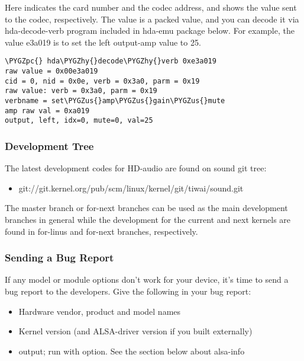 \documentclass[a4paper,8pt,english]{sphinxmanual}
\def\PYGZus{\char`\_}
\def\PYGZpc{\char`\%}
\def\PYGZhy{\char`\-}
\begin{document}
Here \code{{[}0:0{]}} indicates the card number and the codec address, and
 shows the value sent to the codec, respectively.  The value is
a packed value, and you can decode it via hda-decode-verb program
included in hda-emu package below.  For example, the value e3a019 is
to set the left output-amp value to 25.

\begin{Verbatim}[commandchars=\\\{\}]
\PYGZpc{} hda\PYGZhy{}decode\PYGZhy{}verb 0xe3a019
raw value = 0x00e3a019
cid = 0, nid = 0x0e, verb = 0x3a0, parm = 0x19
raw value: verb = 0x3a0, parm = 0x19
verbname = set\PYGZus{}amp\PYGZus{}gain\PYGZus{}mute
amp raw val = 0xa019
output, left, idx=0, mute=0, val=25
\end{Verbatim}


\subsubsection{Development Tree}
\label{sound/hd-audio/notes:development-tree}
The latest development codes for HD-audio are found on sound git tree:
\begin{itemize}
\item {} 
git://git.kernel.org/pub/scm/linux/kernel/git/tiwai/sound.git

\end{itemize}

The master branch or for-next branches can be used as the main
development branches in general while the development for the current
and next kernels are found in for-linus and for-next branches,
respectively.


\subsubsection{Sending a Bug Report}
\label{sound/hd-audio/notes:sending-a-bug-report}
If any model or module options don't work for your device, it's time
to send a bug report to the developers.  Give the following in your
bug report:
\begin{itemize}
\item {} 
Hardware vendor, product and model names

\item {} 
Kernel version (and ALSA-driver version if you built externally)

\item {} 
 output; run with  option.  See the
section below about alsa-info

\end{itemize}
\end{document}
